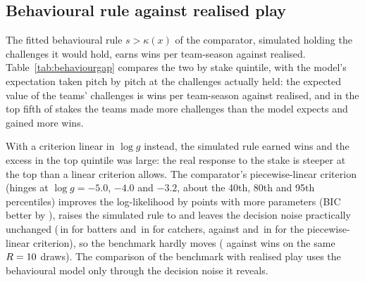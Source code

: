 \documentclass[aoas]{imsart}
\theoremstyle{plain}
\theoremstyle{definition}
\begin{document}
\begin{table}[!htbp]
\caption{Simulator swing relative to engine $g$, minus one, by the count of the branch pitch (benchmark).}\label{tab:gapcount}
\centering\scriptsize

\end{table}

\subsection{Behavioural rule against realised play}\label{sec:behaviourgap}
The fitted behavioural rule $s>\kappa(x)$ of the comparator, simulated holding the challenges it would hold, earns
\WFitRule{} \WFitRuleCI{} wins per team-season against \WObs{} realised. Table~\ref{tab:behaviourgap} compares the two
by stake quintile, with the model's expectation taken pitch by pitch at the challenges actually held: the expected
value of the teams' challenges is \BGValueExpected{} wins per team-season against \BGValueObserved{} realised, and in
the top fifth of stakes the teams made \BGTopChExcess{} more challenges than the model expects and gained
\BGTopValueExcess{} more wins.

With a criterion linear in $\log g$ instead, the simulated rule earned \KGFitRuleMain{} wins and the
excess in the top quintile was large: the real response to the stake is steeper at the top than a linear criterion
allows. The comparator's piecewise-linear criterion (hinges at $\log g=-5.0$, $-4.0$ and $-3.2$, about the 40th, 80th
and 95th percentiles) improves the log-likelihood by \KGDLL{} points with \KGK{} more parameters (BIC better by
\KGDBIC), raises the simulated rule to \KGFitRule{} and leaves the decision noise practically unchanged
(\KGSrBatter\,in for batters and \KGSrCatcher\,in for catchers, against \SrBatter{} and \SrCatcher\,in for the piecewise-linear criterion), so the benchmark
hardly moves (\KGOpt{} against \KGOptMain{} wins on the same $R=10$ draws). The comparison of the benchmark with realised
play uses the behavioural model only through the decision noise it reveals.

\begin{table}[!htbp]
\caption{Observed against model-expected challenges, overturns and value by stake quintile (comparator, expectation at
the challenges actually held). Value: sum of $g$ over overturned challenges, wins per team-season.}\label{tab:behaviourgap}
\centering\small
\resizebox{\textwidth}{!}{}
\end{table}
\end{document}
